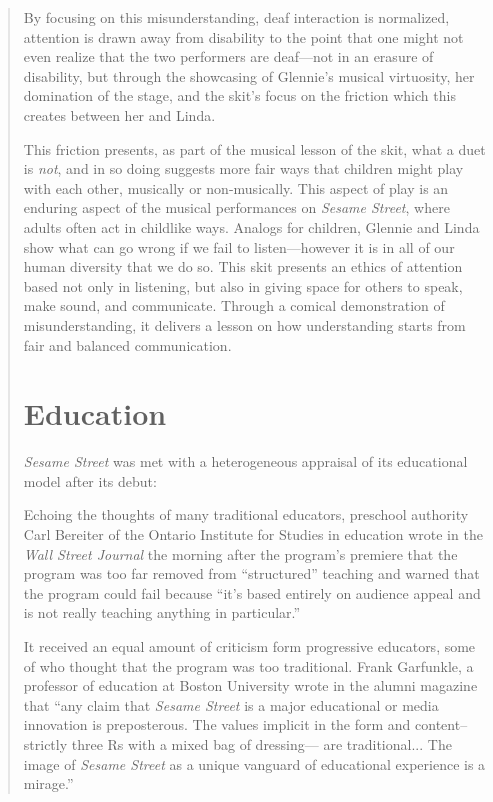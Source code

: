 \documentclass[12pt,letterpaper]{article}
\begin{document}
\begin{quote}
	By focusing on this misunderstanding, deaf interaction is normalized,
	attention is drawn away from disability to the point that one might not
	even realize that the two performers are deaf---not in an erasure of 
	disability, but through the showcasing of Glennie's musical virtuosity,
	her domination of the stage, and the skit's focus on the friction
	which this creates between her and Linda.  

	This friction presents, as part of the musical lesson of the skit, 
	what a duet is \textit{not}, and in so doing suggests more fair ways
	that children might play with each other, musically or non-musically.
	This aspect of play is an enduring aspect of the musical performances
	on \textit{Sesame Street}, where adults often act in childlike ways.
	Analogs for children, Glennie and Linda show what can go wrong if we
	fail to listen---however it is in all of our human diversity that we
	do so. This skit presents an ethics of attention based not only in
	listening, but also in giving space for others to speak, make sound,
	and communicate. Through a comical demonstration of misunderstanding, 
	it delivers a lesson on how understanding starts from fair and balanced
	communication.	


	\section*{Education}	
	

	\textit{Sesame Street} was met with a heterogeneous 
	appraisal of its educational model after its debut: 

	Echoing the thoughts of many traditional educators, preschool authority
	Carl Bereiter of the Ontario Institute for Studies in education wrote in
	the \textit{Wall Street Journal} the morning after the program's 
	premiere that the program was too far removed from ``structured'' 
	teaching and warned that the program could fail because ``it's based 
	entirely on audience appeal and is not really teaching anything in 
	particular.''\autocite[200]{Davis}

	It received an equal amount of criticism form progressive educators, 
	some of who thought that the program was too traditional. Frank 
	Garfunkle, a professor of education at Boston University wrote in the 
	alumni magazine that ``any claim that \textit{Sesame Street} is a major 
	educational or media innovation is preposterous. The values implicit in
	the form and content--strictly three Rs with a mixed bag of dressing---	
	are traditional... The image of \textit{Sesame Street} as a unique 
	vanguard of educational experience is a mirage.''\autocite[201]{Davis}


\end{quote}
\end{document}
